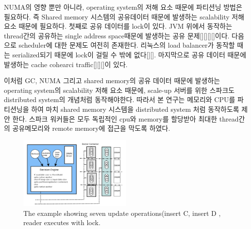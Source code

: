 \fi

\ifkor
NUMA의 영향 뿐만 아니라, operating system의 저해 요소 때문에 
파티션닝 방법은 필요하다.
즉 Shared memory 시스템의 공유데이터 때문에 발생하는 scalability 저해 요소 때문에 필요하다.
첫째로 공유 데이터를 lock이 있다.
JVM 위에서 동작하는 thread간의 공유하는 single address space때문에 발생하는 공유 문제[][][][]이다.
다음으로 scheduler에 대한 문제도 여전히 존재한다. 리눅스의 load balancer가 동작할 때는
serialized되기 때문에 lock이 걸릴 수 밖에 없다[][].
마지막으로 공유 데이터 때문에 발생하는 cache cohearci traffic[][][]이 있다. 
\else

\fi

\ifkor
이처럼 GC, NUMA 그리고 shared memory의 공유 데이터 때문에 발생하는 operating system의
scalability 저해 요소 때문에, scale-up 서버를 위한 스파크도 distributed system의 개념처럼 
동작해야한다.
따라서 본 연구는 메모리와 CPU를 파티션닝을 하여 마치 shared memory 시스템을 distributed system 
처럼 동작하도록 제안 한다.
스파크 워커들은 모두 독립적인 cpu와 memory를 할당받아 최대한 thread간의 공유메모리와 remote
memory에 접근을 막도록 하였다.
\else

\fi

\begin{figure}[h]
  \begin{center}
     \includegraphics[width=0.5\textwidth]{fig/jaildocker}
  \end{center}
  \caption{The example showing seven update operations(insert C, insert D ,
  reader executes with lock.}
  \label{fig:basic}
\end{figure}


